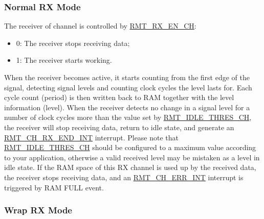 \documentclass[main\_\_EN.tex]{subfiles}
\begin{document}
\subsubsection{Normal RX Mode}\label{sec:normal-rx-mode}

The receiver of channel  is controlled by \hyperref[fielddesc:RMTRXENCHM]{RMT\_RX\_EN\_CH}:
\begin{itemize}
    \item 0: The receiver stops receiving data;
    \item 1: The receiver starts working.
\end{itemize}

When the receiver becomes active, it starts counting from the first edge of the signal, detecting signal levels and counting clock cycles the level lasts for. Each cycle count (period) is then written back to RAM together with the level information (level). When the receiver detects no change in a signal level for a number of clock cycles more than the value set by \hyperref[fielddesc:RMTIDLETHRESCHM]{RMT\_IDLE\_THRES\_CH}, the receiver will stop receiving data, return to idle state, and generate an \hyperref[int:RMTCHMRXENDINT]{RMT\_CH\_RX\_END\_INT} interrupt. Please note that \hyperref[fielddesc:RMTIDLETHRESCHM]{RMT\_IDLE\_THRES\_CH} should be configured to a maximum value according to your application, otherwise a valid received level may be mistaken as a level in idle state. If the RAM space of this RX channel is used up by the received data, the receiver stops receiving data, and an \hyperref[int:RMTCHNERRINT]{RMT\_CH\_ERR\_INT} interrupt is triggered by RAM FULL event.


\subsubsection{Wrap RX Mode}
\end{document}
